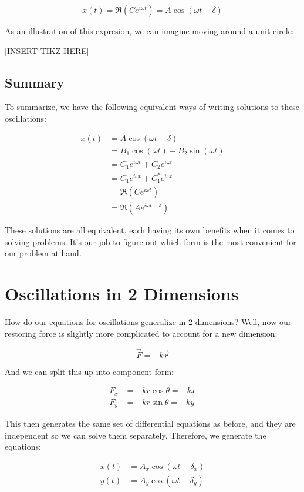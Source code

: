 \[ x(t) = \Re (Ce^{i\omega t}) = A\cos(\omega t - \delta)\]

As an illustration of this expresion, we can imagine moving around a unit circle: 

[INSERT TIKZ HERE]

\subsection{Summary}

To summarize, we have the following equivalent ways of writing solutions to these oscillations: 

\begin{align*}
    x(t) &= A\cos (\omega t - \delta) \\
    &= B_1\cos(\omega t) + B_2 \sin (\omega t)\\
    &= C_1e^{i\omega t} + C_2e^{i\omega t}\\
    &= C_1e^{i\omega t} + C_1^\ast e^{i\omega t}\\
    &= \Re(Ce^{i\omega t})\\
    &= \Re(Ae^{i \omega t - \delta})
\end{align*}

These solutions are all equivalent, each having its own benefits when it comes to solving problems. It's our job to figure out which form is the most convenient for our problem at hand. 

\section{Oscillations in 2 Dimensions}

How do our equations for oscillations generalize in 2 dimensions? Well, now our restoring force is slightly more complicated to account for a new dimension: 

\[ \vec F = -k\vec r\] 

And we can split this up into component form:

\begin{align*}
    F_x &= -kr \cos \theta = -kx\\
    F_y &= -kr \sin \theta = -ky
\end{align*}

This then generates the same set of differential equations as before, and they are independent so we can solve them separately. Therefore, we generate the equations: 

\begin{align*}
    x(t) &= A_x \cos (\omega t - \delta_x)\\
    y(t) &= A_y \cos (\omega t - \delta_y)
\end{align*}


